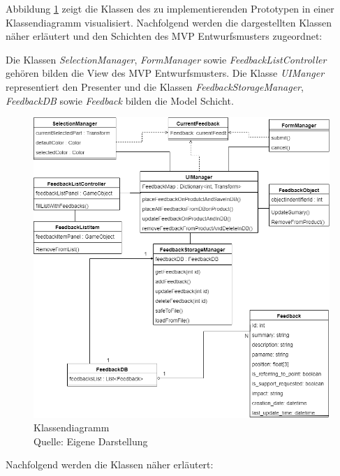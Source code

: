 Abbildung \ref{img:clasdiagramm} zeigt die Klassen des zu implementierenden Prototypen in einer Klassendiagramm visualisiert. Nachfolgend werden die dargestellten Klassen näher erläutert und den Schichten des MVP Entwurfsmusters zugeordnet: 

Die Klassen \textit{SelectionManager}, \textit{FormManager} sowie \textit{FeedbackListController} gehören bilden die View des MVP Entwurfsmusters. Die Klasse \textit{UIManger} representiert den Presenter und die Klassen 
\textit{FeedbackStorageManager}, \textit{FeedbackDB} sowie \textit{Feedback} bilden die Model Schicht.\\ 

\begin{figure}[H]
	\centering
	\includegraphics[width=.9\textwidth]{resources/conception/klassendiagramm.png}
	\caption{Klassendiagramm \\Quelle: Eigene Darstellung}
	\label{img:clasdiagramm}
\end{figure}

Nachfolgend werden die Klassen näher erläutert: 

